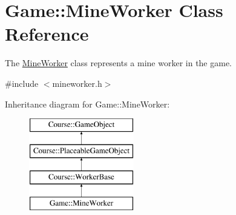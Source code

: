 \hypertarget{classGame_1_1MineWorker}{\section{Game\-:\-:Mine\-Worker Class Reference}
\label{classGame_1_1MineWorker}
}


The \hyperlink{classGame_1_1MineWorker}{Mine\-Worker} class represents a mine worker in the game.  




{\ttfamily \#include $<$mineworker.\-h$>$}

Inheritance diagram for Game\-:\-:Mine\-Worker\-:\begin{figure}[H]
\begin{center}
\leavevmode
\includegraphics[height=4.000000cm]{classGame_1_1MineWorker}
\end{center}
\end{figure}
